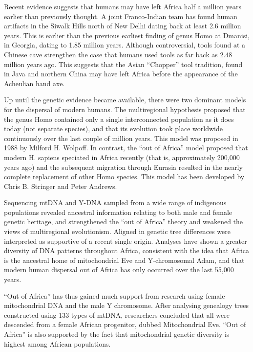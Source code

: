 Recent evidence suggests that humans may have left Africa half a million years earlier than previously thought. A joint Franco-Indian team has found human artifacts in the Siwalk Hills north of New Delhi dating back at least 2.6 million years. This is earlier than the previous earliest finding of genus Homo at Dmanisi, in Georgia, dating to 1.85 million years. Although controversial, tools found at a Chinese cave strengthen the case that humans used tools as far back as 2.48 million years ago. This suggests that the Asian ``Chopper'' tool tradition, found in Java and northern China may have left Africa before the appearance of the Acheulian hand axe.

Up until the genetic evidence became available, there were two dominant models for the dispersal of modern humans. The multiregional hypothesis proposed that the genus Homo contained only a single interconnected population as it does today (not separate species), and that its evolution took place worldwide continuously over the last couple of million years. This model was proposed in 1988 by Milford H. Wolpoff. In contrast, the ``out of Africa'' model proposed that modern H. sapiens speciated in Africa recently (that is, approximately 200,000 years ago) and the subsequent migration through Eurasia resulted in the nearly complete replacement of other Homo species. This model has been developed by Chris B. Stringer and Peter Andrews.

Sequencing mtDNA and Y-DNA sampled from a wide range of indigenous populations revealed ancestral information relating to both male and female genetic heritage, and strengthened the ``out of Africa'' theory and weakened the views of multiregional evolutionism. Aligned in genetic tree differences were interpreted as supportive of a recent single origin. Analyses have shown a greater diversity of DNA patterns throughout Africa, consistent with the idea that Africa is the ancestral home of mitochondrial Eve and Y-chromosomal Adam, and that modern human dispersal out of Africa has only occurred over the last 55,000 years.

``Out of Africa'' has thus gained much support from research using female mitochondrial DNA and the male Y chromosome. After analysing genealogy trees constructed using 133 types of mtDNA, researchers concluded that all were descended from a female African progenitor, dubbed Mitochondrial Eve. ``Out of Africa'' is also supported by the fact that mitochondrial genetic diversity is highest among African populations.

